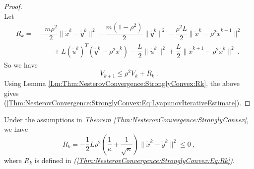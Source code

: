 \begin{proof}
\begin{equation}
\end{equation}
Let
\begin{equation}\label{Thm:NesterovConvergence:StronglyConvex:Eq:Rk}
\begin{array}{ll}
R_k=& -\dfrac{m\rho^2}{2}\|\tilde x^k-\tilde y^k\|^2
-\dfrac{m(1-\rho^2)}{2}\|\tilde y^k\|^2
-\dfrac{\rho^2L}{2}\|\tilde x^k-\rho^2\tilde x^{k-1}\|^2 \\
&\qquad
+L(\tilde u^k)^T(\tilde y^k-\rho^2\tilde x^k)
-\dfrac{L}{2}\|\tilde u^k\|^2
+\dfrac{L}{2}\|\tilde x^{k+1}-\rho^2\tilde x^k\|^2 \ .
\end{array}
\end{equation}
So we have
$$V_{k+1}\leq \rho^2 V_k + R_k \ .$$
Using Lemma \ref{Lm:Thm:NesterovConvergence:StronglyConvex:Rk}, the above gives (\ref{Thm:NesterovConvergence:StronglyConvex:Eq:LyapunovIterativeEstimate}). 
\end{proof}

\begin{lemma}\label{Lm:Thm:NesterovConvergence:StronglyConvex:Rk}
Under the assumptions in \emph{Theorem \ref{Thm:NesterovConvergence:StronglyConvex}}, we have
$$R_k
=
-\frac12 L\rho^2
\left(
\frac1{\kappa}+\frac1{\sqrt{\kappa}}
\right)
\|
\tilde{x}^k-\tilde{y}^k
\|^2
\le 0 \ ,
$$
where $R_k$ is defined in \emph{(\ref{Thm:NesterovConvergence:StronglyConvex:Eq:Rk})}.
\end{lemma}

